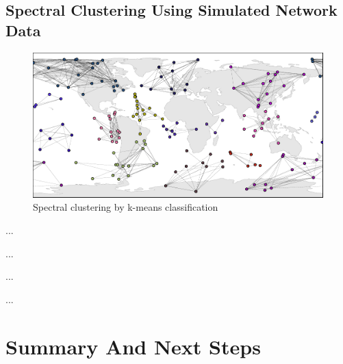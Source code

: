\documentclass[conference]{IEEEtran}
\begin{document}
\subsection{Spectral Clustering Using Simulated Network Data}
\label{ssec:cluster}

\begin{figure}[t!]
  \centerline{\includegraphics[width=\linewidth]{images/clusters.pdf}}
  \caption{Spectral clustering by k-means classification}
  \label{fig:clusters}
\end{figure}

\vspace{80pt}

...

\vspace{80pt}

...

\vspace{80pt}

...

\vspace{80pt}

...

\vspace{80pt}


\section{Summary And Next Steps}
\label{sec:summary}

\vspace{80pt}

\end{document}
